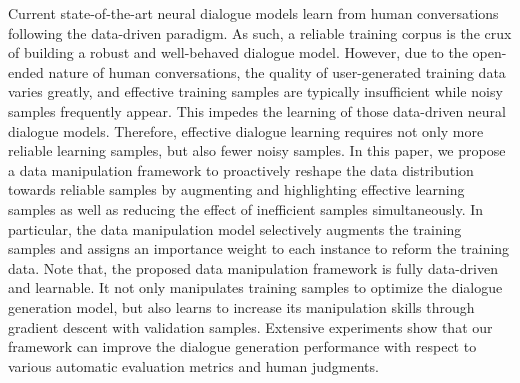 Current state-of-the-art neural dialogue models learn from human conversations following the data-driven paradigm. As such, a reliable training corpus is the crux of building a robust and well-behaved dialogue model. However, due to the open-ended nature of human conversations, the quality of user-generated training data varies greatly, and effective training samples are typically insufficient while noisy samples frequently appear. This impedes the learning of those data-driven neural dialogue models. Therefore, effective dialogue learning requires not only more reliable learning samples, but also fewer noisy samples. In this paper, we propose a data manipulation framework to proactively reshape the data distribution towards reliable samples by augmenting and highlighting effective learning samples as well as reducing the effect of inefficient samples simultaneously. In particular, the data manipulation model selectively augments the training samples and assigns an importance weight to each instance to reform the training data. Note that, the proposed data manipulation framework is fully data-driven and learnable. It not only manipulates training samples to optimize the dialogue generation model, but also learns to increase its manipulation skills through gradient descent with validation samples. Extensive experiments show that our framework can improve the dialogue generation performance with respect to various automatic evaluation metrics and human judgments.
